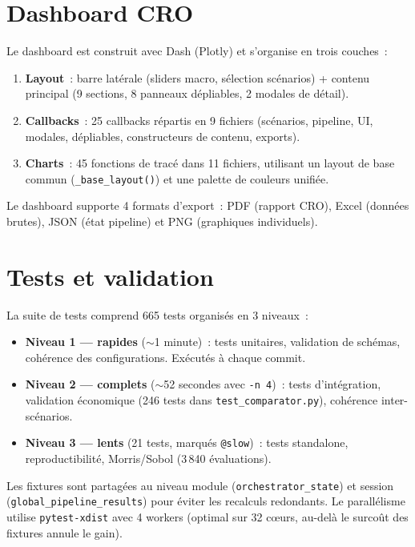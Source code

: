 \documentclass[12pt, a4paper, twoside, openright]{report}
\theoremstyle{definition}
\begin{document}
\section{Dashboard CRO}
\label{sec:archi-dashboard}

Le dashboard est construit avec Dash (Plotly) et s'organise en trois couches~:

\begin{enumerate}
\item \textbf{Layout}~: barre latérale (sliders macro, sélection scénarios) + contenu principal (9 sections, 8 panneaux dépliables, 2 modales de détail).
\item \textbf{Callbacks}~: 25 callbacks répartis en 9 fichiers (scénarios, pipeline, UI, modales, dépliables, constructeurs de contenu, exports).
\item \textbf{Charts}~: 45 fonctions de tracé dans 11 fichiers, utilisant un layout de base commun (\texttt{\_base\_layout()}) et une palette de couleurs unifiée.
\end{enumerate}

Le dashboard supporte 4 formats d'export~: PDF (rapport CRO), Excel (données brutes), JSON (état pipeline) et PNG (graphiques individuels).

\section{Tests et validation}
\label{sec:archi-tests}

La suite de tests comprend 665 tests organisés en 3 niveaux~:

\begin{itemize}
\item \textbf{Niveau 1 --- rapides} ($\sim$1 minute)~: tests unitaires, validation de schémas, cohérence des configurations. Exécutés à chaque commit.
\item \textbf{Niveau 2 --- complets} ($\sim$52 secondes avec \texttt{-n 4})~: tests d'intégration, validation économique (246 tests dans \texttt{test\_comparator.py}), cohérence inter-scénarios.
\item \textbf{Niveau 3 --- lents} (21 tests, marqués \texttt{@slow})~: tests standalone, reproductibilité, Morris/Sobol (3\,840 évaluations).
\end{itemize}

Les fixtures sont partagées au niveau module (\texttt{orchestrator\_state}) et session (\texttt{global\_pipeline\_results}) pour éviter les recalculs redondants. Le parallélisme utilise \texttt{pytest-xdist} avec 4 workers (optimal sur 32 c\oe urs, au-delà le surcoût des fixtures annule le gain).
\end{document}
